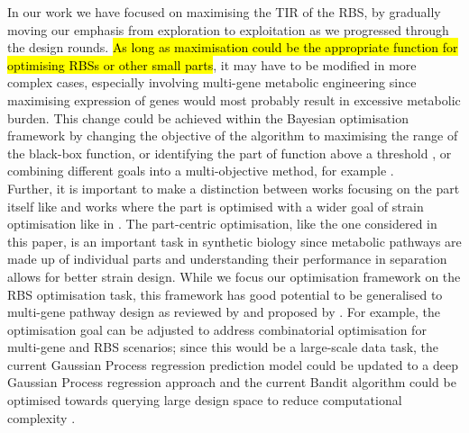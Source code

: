 \documentclass{article}
\begin{document}
In our work we have focused on maximising the TIR of the RBS, by gradually moving our emphasis from exploration to exploitation as we progressed through the design rounds.
\hl{As long as maximisation could be the appropriate function for optimising RBSs or other small parts}, it may have to be modified in more complex cases, especially involving multi-gene metabolic engineering since maximising expression of genes would most probably result in excessive metabolic burden.
This change could be achieved within the Bayesian optimisation framework by changing the objective of the algorithm to maximising the range of the black-box function, or identifying the part of function above a threshold \mbox{\cite{gotovos2013active}}, or combining different goals into a multi-objective method, for example \mbox{\cite{shu2020new}}.\\

Further, it is important to make a distinction between works focusing on the part itself like \mbox{\textcite{Hollerer2020}} and works where the part is optimised with a wider goal of strain optimisation like in \mbox{\textcite{Jervis2019}}.
The part-centric optimisation, like the one considered in this paper, is an important task in synthetic biology since metabolic pathways are made up of individual parts and understanding their performance in separation allows for better strain design. 
While we focus our optimisation framework on the RBS optimisation task, this framework has good potential to be generalised to multi-gene pathway design as reviewed by \mbox{\textcite{LAWSON2021}} and proposed by \mbox{\textcite{hamedirad2019towards}}. 
For example, the optimisation goal can be adjusted to address combinatorial optimisation for multi-gene and RBS scenarios; since this would be a large-scale data task, the current Gaussian Process regression prediction model could be updated to a deep Gaussian Process regression approach and the current Bandit algorithm could be optimised towards querying large design space to reduce computational complexity \mbox{\textcite{Shahriari2016}}.  
\\
\end{document}

